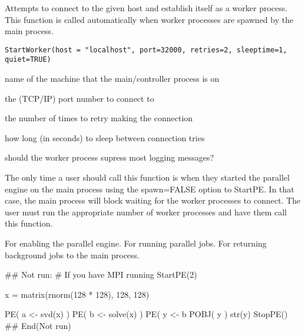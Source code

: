 \documentclass{article}
\begin{document}
\begin{Description}\relax
Attempts to connect to the given host and establish itself as a worker
process.  This function is called automatically when worker processes
are spawned by the main process.
\end{Description}
\begin{Usage}
\begin{verbatim}
StartWorker(host = "localhost", port=32000, retries=2, sleeptime=1, quiet=TRUE)
\end{verbatim}
\end{Usage}
\begin{Arguments}
\begin{ldescription}
\item[\code{host}] name of the machine that the main/controller process is on 
\item[\code{port}] the (TCP/IP) port number to connect to 
\item[\code{retries}] the number of times to retry making the connection 
\item[\code{sleeptime}] how long (in seconds) to sleep between connection tries 
\item[\code{quiet}] should the worker process supress most logging messages? 
\end{ldescription}
\end{Arguments}
\begin{Details}\relax
The only time a user should call this function is when they started the
parallel engine on the main process using the spawn=FALSE option to
StartPE.  In that case, the main process will block waiting for the
worker processes to connect.  The user must run the appropriate number
of worker processes and have them call this function.
\end{Details}
\begin{SeeAlso}\relax
{}  For enabling the parallel engine.
        For running parallel jobs.
  For returning background jobs to the main process.
\end{SeeAlso}
\begin{Examples}
\begin{ExampleCode}
## Not run: 
# If you have MPI running
StartPE(2)

x = matrix(rnorm(128 * 128), 128, 128)

PE( a <- svd(x) )
PE( b <- solve(x) )
PE( y <- b %
POBJ( y )
str(y)
StopPE()
## End(Not run)
\end{ExampleCode}
\end{Examples}
\end{document}
